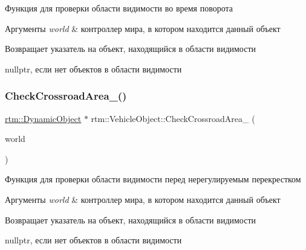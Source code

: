 Функция для проверки области видимости во время поворота 


\begin{DoxyParams}{Аргументы}
{\em world} & контроллер мира, в котором находится данный объект \\
\hline
\end{DoxyParams}
\begin{DoxyReturn}{Возвращает}
указатель на объект, находящийся в области видимости 

nullptr, если нет объектов в области видимости 
\end{DoxyReturn}
\mbox{\label{classrtm_1_1_vehicle_object_a1e193bc81dc4b6c14d29c6be17db1071}} 
\subsubsection{\texorpdfstring{Check\+Crossroad\+Area\+\_\+()}{CheckCrossroadArea\_()}}
{\footnotesize\ttfamily \hyperlink{classrtm_1_1_dynamic_object}{rtm\+::\+Dynamic\+Object} $\ast$ rtm\+::\+Vehicle\+Object\+::\+Check\+Crossroad\+Area\+\_\+ (\begin{DoxyParamCaption}\item[{\hyperlink{classrtm_1_1_world_controller}{World\+Controller} $\ast$const}]{world }\end{DoxyParamCaption})\hspace{0.3cm}{\ttfamily [protected]}}



Функция для проверки области видимости перед нерегулируемым перекрестком 


\begin{DoxyParams}{Аргументы}
{\em world} & контроллер мира, в котором находится данный объект \\
\hline
\end{DoxyParams}
\begin{DoxyReturn}{Возвращает}
указатель на объект, находящийся в области видимости 

nullptr, если нет объектов в области видимости 
\end{DoxyReturn}
\mbox{\label{classrtm_1_1_vehicle_object_a397b0e3055f0dfe3f2b1b731cd5e2eb1}} 
